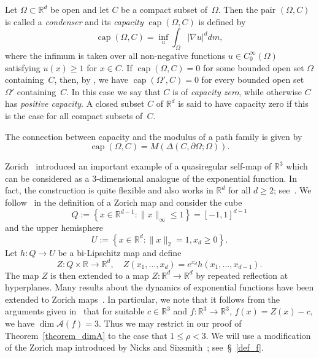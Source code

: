 \documentclass[12pt,a4paper]{amsart}
\theoremstyle{plain}
\theoremstyle{definition}
\theoremstyle{remark}
\newcommand{\capacity}{\operatorname{cap}}
\def\R{\mathbb R}
\def\cA{\mathcal A}
\numberwithin{equation}{section}
\begin{document}
Let $\Omega\subset\R^d$ be open and let $C$ be a compact subset of~$\Omega$.
Then the pair $(\Omega,C)$ is called a \emph{condenser} and
its \emph{capacity} $\capacity (\Omega,C)$ is defined by
\[
\capacity (\Omega,C)=\inf_u\int_\Omega\left|\nabla u\right|^d dm,
\]
where the infimum is taken over all non-negative functions
$u\in C^\infty_0(\Omega)$ satisfying $u(x)\geq 1$ for $x\in C$.
If $\capacity (\Omega,C)=0$ for some bounded open set $\Omega$ containing~$C$, then,
by \cite[Lemma III.2.2]{Rickman1993},
we have $\capacity (\Omega',C)=0$ for every bounded open set $\Omega'$ containing~$C$.
In this case we say that $C$ is of  \emph{capacity zero}, while
otherwise $C$ has \emph{positive capacity}.
A closed subset $C$ of $\R^d$ is said to have capacity
zero if this is the case for all compact subsets of~$C$.

The connection between capacity and the modulus of a path family is given by~\cite[Proposition II.10.2]{Rickman1993}
\[
\capacity (\Omega,C)=M(\Delta(C,\partial \Omega;\Omega)).
\]

Zorich~\cite[p.~400]{Zorich1967} introduced an 
important example of a quasiregular self-map of $\R^3$
which can be considered as a $3$-dimensional analogue of the exponential 
function.
In fact, the construction is quite flexible and 
also works in $\R^d$ for all $d\geq 2$;
see~\cite[\S~8.1]{Martio1975}.
We follow~\cite[\S~6.5.4]{Iwaniec2001} in the definition of a Zorich map 
and consider the cube
\begin{equation}\label{0g}
Q:=\left\{x\in \R^{d-1}\colon \|x\|_\infty \leq 1\right\}=[-1,1]^{d-1}
\end{equation}
and the upper hemisphere
\begin{equation}\label{0h}
U:=\left\{x\in \R^{d}\colon \|x\|_2 = 1, x_d\geq 0 \right\}.
\end{equation}
Let $h\colon Q\to U$ be a bi-Lipschitz map and define
\begin{equation}\label{0i}
Z\colon Q\times \R \to \R^d,\quad
Z(x_1,\dots,x_d)=e^{x_d}h(x_1,\dots,x_{d-1}).
\end{equation}
The map $Z$ is then extended to a map $Z\colon \R^d\to\R^d$ by repeated reflection at 
hyperplanes.
Many results about the dynamics of exponential functions have been extended to
Zorich maps~\cite{Bergweiler2010,BD,Comduehr2019,Tsantaris2020,Tsantaris2021}.
In particular, we note that it follows from the arguments given in~\cite[\S~4]{Bergweiler2010}
that for suitable $c\in\R^3$ and $f\colon\R^3\to\R^3$, $f(x)=Z(x)-c$, we have 
$\dim\cA(f)=3$. Thus we may restrict in our proof
of Theorem~\ref{theorem_dimA} to the case that $1\leq \rho<3$.
We will use a modification of the Zorich map introduced by Nicks and
Sixsmith~\cite{Nicks2018}; see~\S~\ref{def_f}.
\end{document}
